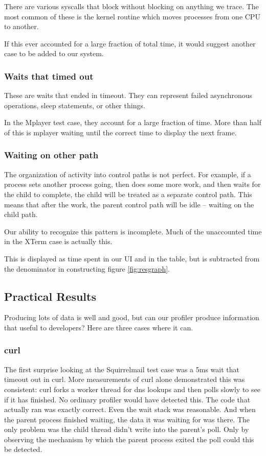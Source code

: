 \documentclass[10pt]{article}
\begin{document}
There are various syscalls that block without blocking on anything we trace.  The most common of these is the kernel routine which moves processes from one CPU to another.

If this ever accounted for a large fraction of total time, it would suggest another case to be added to our system.

\subsubsection{Waits that timed out}

These are waits that ended in timeout.  They can represent failed asynchronous operations, sleep statements, or other things.

In the Mplayer test case, they account for a large fraction of time.  More than half of this is mplayer waiting until the correct time to display the next frame.

\subsubsection{Waiting on other path}

The organization of activity into control paths is not perfect.  For example, if a process sets another process going, then does some more work, and then waits for the child to complete, the child will be treated as a separate control path.  This means that after the work, the parent control path will be idle -- waiting on the child path.

Our ability to recognize this pattern is incomplete.  Much of the unaccounted time in the XTerm case is actually this.

This is displayed as time spent in our UI and in the table, but is subtracted from the denominator in constructing figure \ref{fig:resgraph}.

\subsection{Practical Results}

Producing lots of data is well and good, but can our profiler produce information that useful to developers?  Here are three cases where it can.

\subsubsection{curl}

The first surprise looking at the Squirrelmail test case was a 5ms wait that timeout out in curl.  More measurements of curl alone demonstrated this was consistent: curl forks a worker thread for dns lookups and then polls slowly to see if it has finished.  No ordinary profiler would have detected this.  The code that actually ran was exactly correct.  Even the wait stack was reasonable.  And when the parent process finished waiting, the data it was waiting for was there.  The only problem was the child thread didn't write into the parent's poll.  Only by observing the mechanism by which the parent process exited the poll could this be detected.
\end{document}
